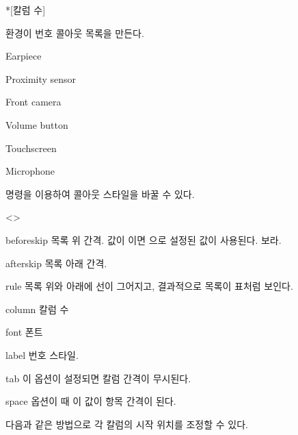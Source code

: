 \documentclass[minted]{hzguide}
\begin{document}
\begin{code}
\begin{callout}*[칼럼 수] \item \end{callout}
\end{code}

 환경이 번호 콜아웃 목록을 만든다.

\begin{coderesult}
\begin{callout}
\item Earpiece
\item Proximity sensor
\item Front camera
\item Volume button
\item Touchscreen
\item Microphone
\end{callout}
\end{coderesult}

\macro{\CalloutSetup} 명령을 이용하여 콜아웃 스타일을 바꿀 수 있다.

\begin{macros}<\CalloutSetup>
\item[beforeskip] \keyvalue{\hznulldim, 0.5\onelineskip}
목록 위 간격. 값이 
\macro{\hznulldim}이면 \macro{\ObjectSetup}으로 설정된 값이 사용된다.
\를 보라.

\item[afterskip] \keyvalue{\hznulldim, 0.5\onelineskip}
목록 아래 간격. 

\item[rule] \keyvalueTF
목록 위와 아래에 선이 그어지고, 결과적으로 목록이 표처럼 보인다.

\item[column] 
칼럼 수

\item[font] \keyvalue{\small}
폰트

\item[label] \keyvalue{\makebox[1.25em]{\hfill\calloutno)}\enspace}
번호 스타일. 

\item[tab] \keyvalueTF
이 옵션이  설정되면 칼럼 간격이 무시된다.

\item[space] \keyvalue{0.25em}
 옵션이  때 이 값이 항목 간격이 된다.
\end{macros}


다음과 같은 방법으로 각 칼럼의 시작 위치를 조정할 수 있다.
\end{document}
